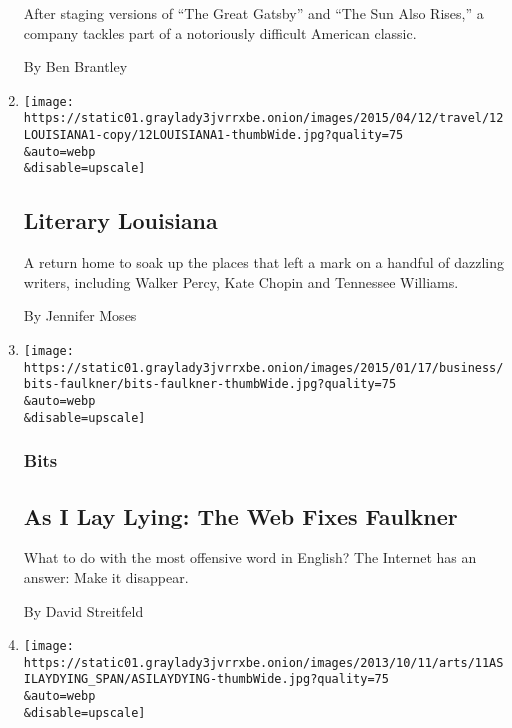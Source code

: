 \begin{enumerate}
  After staging versions of ``The Great Gatsby'' and ``The Sun Also
  Rises,'' a company tackles part of a notoriously difficult American
  classic.

  By Ben Brantley
\item
  \href{/2015/04/12/travel/12Cover-Literary-Louisiana.html}{}

  \texttt{[image: https://static01.graylady3jvrrxbe.onion/images/2015/04/12/travel/12LOUISIANA1-copy/12LOUISIANA1-thumbWide.jpg?quality=75\\\&auto=webp\\\&disable=upscale]}

  \hypertarget{literary-louisiana}{%
  \subsection{Literary Louisiana}\label{literary-louisiana}}

  A return home to soak up the places that left a mark on a handful of
  dazzling writers, including Walker Percy, Kate Chopin and Tennessee
  Williams.

  By Jennifer Moses
\item
  \href{https://bits.blogs.nytimes3xbfgragh.onion/2015/01/20/as-i-lay-lying-the-web-fixes-faulkner/}{}

  \texttt{[image: https://static01.graylady3jvrrxbe.onion/images/2015/01/17/business/bits-faulkner/bits-faulkner-thumbWide.jpg?quality=75\\\&auto=webp\\\&disable=upscale]}

  \hypertarget{bits}{%
  \subsubsection{Bits}\label{bits}}

  \hypertarget{as-i-lay-lying-the-web-fixes-faulkner}{%
  \subsection{As I Lay Lying: The Web Fixes
  Faulkner}\label{as-i-lay-lying-the-web-fixes-faulkner}}

  What to do with the most offensive word in English? The Internet has
  an answer: Make it disappear.

  By David Streitfeld
\item
  \href{/2013/10/11/movies/james-franco-directs-and-stars-in-as-i-lay-dying.html}{}

  \texttt{[image: https://static01.graylady3jvrrxbe.onion/images/2013/10/11/arts/11ASILAYDYING\_SPAN/ASILAYDYING-thumbWide.jpg?quality=75\\\&auto=webp\\\&disable=upscale]}


\end{enumerate}
